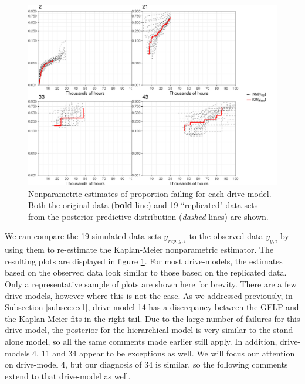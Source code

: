 \documentclass[12pt]{article}
\begin{document}
\begin{figure}[H]
\includegraphics[width=\textwidth]{ppcheck-sample}
\caption{Nonparametric estimates of proportion failing for each drive-model. Both the original data (\textbf{bold} line) and 19 ``replicated" data sets from the posterior predictive distribution (\textit{dashed} lines) are shown.}
\label{fig:post-pred-KM}
\end{figure}

We can compare the 19 simulated data sets $y_{rep,g, i}$ to the observed data $y_{g,i}$ by using them to re-estimate the Kaplan-Meier nonparametric estimator. The resulting plots are displayed in figure \ref{fig:post-pred-KM}. For most drive-models, the estimates based on the observed data look similar to those based on the replicated data. Only a representative sample of plots are shown here for brevity. There are a few drive-models, however where this is not the case. As we addressed previously, in Subsection \ref{subsec:ex1}, drive-model 14 has a discrepancy between the GFLP and the Kaplan-Meier fits in the right tail. Due to the large number of failures for this drive-model, the posterior for the hierarchical model is very similar to the stand-alone model, so all the same comments made earlier still apply. In addition, drive-models 4, 11 and 34 appear to be exceptions as well. We will focus our attention on drive-model 4, but our diagnosis of 34 is similar, so the following comments extend to that drive-model as well.
\end{document}
